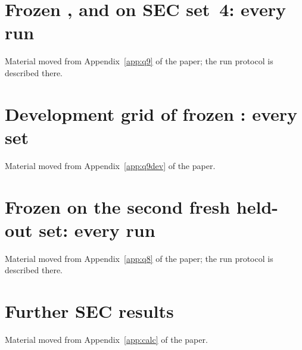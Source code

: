 







\clearpage
\section{Frozen ,  and  on SEC set~4: every run}\label{sup:q9}
Material moved from Appendix~\ref{app:q9} of the paper; the run protocol is described there.



\clearpage
\section{Development grid of frozen : every set}\label{sup:q9dev}
Material moved from Appendix~\ref{app:q9dev} of the paper.


\clearpage
\section{Frozen  on the second fresh held-out set: every run}\label{sup:q8}
Material moved from Appendix~\ref{app:q8} of the paper; the run protocol is described there.










\clearpage
\section{Further SEC results}\label{sup:calc}
Material moved from Appendix~\ref{app:calc} of the paper.

